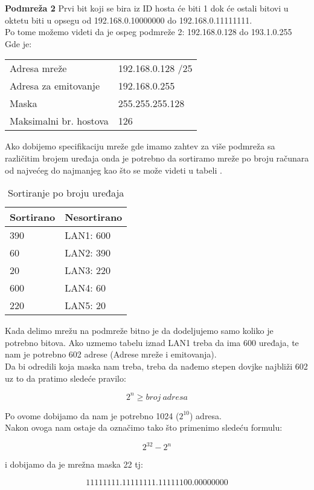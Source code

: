 \textbf{Podmreža 2} Prvi bit koji se bira iz ID hosta \'{c}e biti 1 dok \'{c}e ostali bitovi u oktetu biti u opsegu od 192.168.0.10000000 do 192.168.0.11111111.\\

Po tome možemo videti da je ospeg podmreže 2: 192.168.0.128 do 193.1.0.255\\
Gde je:\\
\begin{table}[H]
\begin{center}
\begin{tabular}{ll}
Adresa mreže           & 192.168.0.128 /25 \\
Adresa za emitovanje   & 192.168.0.255   \\
Maska                  & 255.255.255.128 \\
Maksimalni br. hostova & 126             \\             
\end{tabular}
\end{center}
\end{table}

Ako dobijemo specifikaciju mreže gde imamo zahtev za više podmreža sa različitim brojem uređaja onda je potrebno da sortiramo mreže po broju računara od najve\'{c}eg do najmanjeg kao što se može videti u tabeli .

\begin{table}[H]
\begin{center}
\begin{tabular}{ll}
\textbf{Sortirano} & \textbf{Nesortirano} \\\hline\hline
390       & LAN1: 600   \\
60        & LAN2: 390   \\
20        & LAN3: 220   \\
600       & LAN4: 60    \\
220       & LAN5: 20   
\end{tabular}
\caption{Sortiranje po broju uređaja}
\label{tab:sortiranje_uredjaja}
\end{center}
\end{table}

Kada delimo mrežu na podmreže bitno je da dodeljujemo samo koliko je potrebno bitova. Ako uzmemo tabelu iznad LAN1 treba da ima 600 uređaja, te nam je potrebno 602 adrese (Adrese mreže i emitovanja).\\

Da bi odredili koja maska nam treba, treba da nađemo stepen dovjke najbliži 602 uz to da pratimo slede\'{c}e pravilo:

$$2^n \geq broj\ adresa$$

Po ovome dobijamo da nam je potrebno 1024 ($2^{10}$) adresa.\\

Nakon ovoga nam ostaje da označimo tako što primenimo slede\'{c}u formulu:

$$2^{32} - 2^n$$

i dobijamo da je mrežna maska 22 tj:

$$11111111.11111111.11111100.00000000$$

